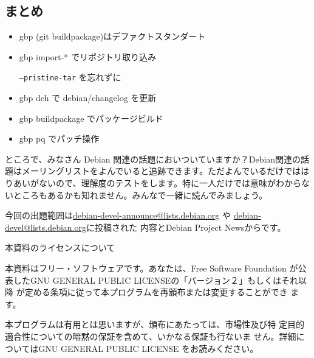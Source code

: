 \documentclass[mingoth,a4paper]{jsarticle}
\begin{document}
\subsection{まとめ}

\begin{itemize}
\item gbp (git buildpackage)はデファクトスタンダート
\item gbp import-* でリポジトリ取り込み
  
  \texttt{--pristine-tar} を忘れずに
\item gbp dch で debian/changelog を更新
\item gbp buildpackage でパッケージビルド
\item gbp pq でパッチ操作
\end{itemize}


ところで、みなさん Debian 関連の話題においついていますか？Debian関連の話
題はメーリングリストをよんでいると追跡できます。ただよんでいるだけではは
りあいがないので、理解度のテストをします。特に一人だけでは意味がわからな
いところもあるかも知れません。みんなで一緒に読んでみましょう。

今回の出題範囲は\url{debian-devel-announce@lists.debian.org} や \url{debian-devel@lists.debian.org}に投稿された
内容とDebian Project Newsからです。

\begin{multicols}{2}



\end{multicols}


\newpage

\begin{center}
本資料のライセンスについて
\end{center}

本資料はフリー・ソフトウェアです。あなたは、Free Software
Foundation が公表したGNU GENERAL PUBLIC LICENSEの「バージョン２」もしくはそれ以降
が定める条項に従って本プログラムを再頒布または変更することができ
ます。

本プログラムは有用とは思いますが、頒布にあたっては、市場性及び特
定目的適合性についての暗黙の保証を含めて、いかなる保証も行ないま
せん。詳細についてはGNU GENERAL PUBLIC LICENSE をお読みください。
\end{document}
